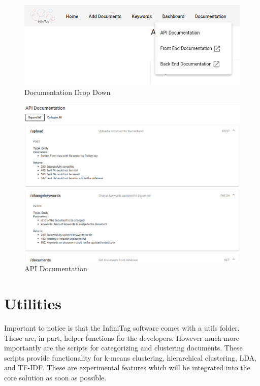 \documentclass{article}
\begin{document}
\begin{figure}
    \centering
    \includegraphics[scale=0.4]{img/doc3.png}
    \caption{Documentation Drop Down}
    \label{fig:doc_drop}
\end{figure}

\begin{figure}
    \centering
    \includegraphics[scale=0.4]{img/api1.png}
    \caption{API Documentation}
    \label{fig:apidoc}
\end{figure}


\section{Utilities}
Important to notice is that the InfiniTag software comes with a utils folder. These are, in part, helper functions for the developers. However much more importantly are the scripts for categorizing and clustering documents. These scripts provide functionality for k-means clustering, hierarchical clustering, LDA, and TF-IDF. These are experimental features which will be integrated into the core solution as soon as possible.
\end{document}
